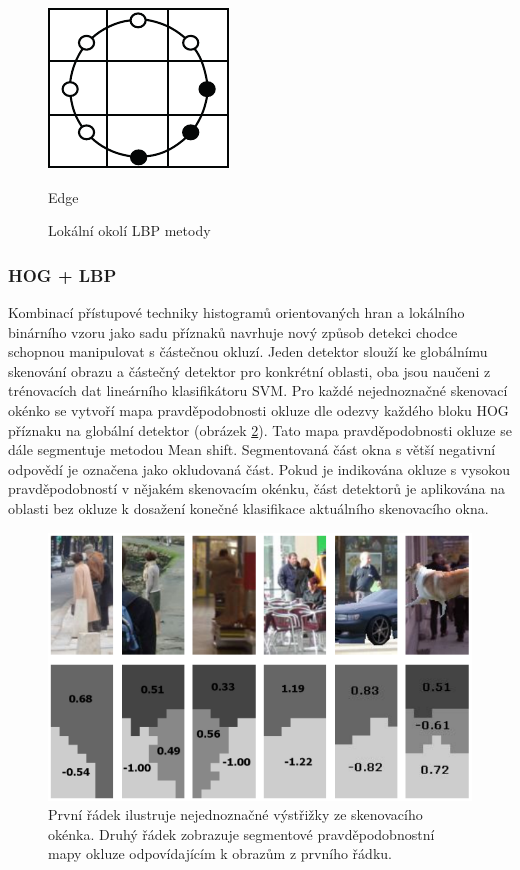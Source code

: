 \begin{figure}[H]
\begin{minipage}[b]{.18\textwidth}
  \includegraphics[width=.9\linewidth]{figures/lbp_edge}
  \caption*{Edge}
\end{minipage}
\caption{Lokální okolí LBP metody \cite{lbp:orig}}
\label{fig:lbpvzory}
\end{figure}

\subsubsection*{HOG + LBP}
Kombinací přístupové techniky histogramů orientovaných hran a lokálního binárního vzoru jako sadu příznaků navrhuje nový způsob detekci chodce schopnou manipulovat s částečnou okluzí. Jeden detektor slouží ke globálnímu skenování obrazu a částečný detektor pro konkrétní oblasti, oba jsou naučeni z trénovacích dat lineárního klasifikátoru SVM. Pro každé nejednoznačné skenovací okénko se vytvoří mapa pravděpodobnosti okluze dle odezvy každého bloku HOG příznaku na globální detektor (obrázek \ref{fig:hoglbp}). Tato mapa pravděpodobnosti okluze se dále segmentuje metodou Mean shift. Segmentovaná část okna s větší negativní odpovědí je označena jako okludovaná část. Pokud je indikována okluze s vysokou pravděpodobností v nějakém skenovacím okénku, část detektorů je aplikována na oblasti bez okluze k dosažení konečné klasifikace aktuálního skenovacího okna. \cite{hoglpb}

\begin{figure}[H]
\centering
\includegraphics[width=.6\linewidth]{figures/hoglbp_obr}
\caption{ První řádek ilustruje nejednoznačné výstřižky ze skenovacího okénka. Druhý řádek zobrazuje segmentové pravděpodobnostní mapy okluze odpovídajícím k obrazům z prvního řádku.\cite{hoglpb}}
\label{fig:hoglbp}
\end{figure}

